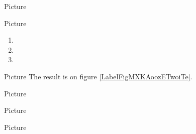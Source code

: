 

Picture 
\begin{center}
   
\end{center}
   


Picture 
\begin{center}
   
   
   
\end{center}

\begin{enumerate}
    \item
   
   \item
   
   \item
   
\end{enumerate}

Picture 
The result is on figure \ref{LabelFigMXKAoozETwoiTe}. %
\newcommand{\CaptionFigMXKAoozETwoiTe}{An histogram.}



Picture 
\begin{center}
   
\end{center}



Picture 
\begin{center}
   
\end{center}
   


Picture 
\begin{center}
   
\end{center}

